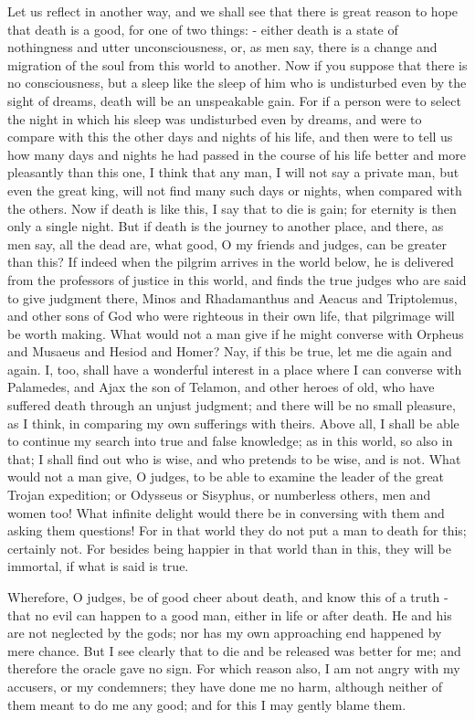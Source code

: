 \documentclass[11pt]{article}
\begin{document}
Let us reflect in another way, and we shall see that there is great reason to hope that death is a good, for one of two things: - either death is a state of nothingness and utter unconsciousness, or, as men say, there is a change and migration of the soul from this world to another. Now if you suppose that there is no consciousness, but a sleep like the sleep of him who is undisturbed even by the sight of dreams, death will be an unspeakable gain. For if a person were to select the night in which his sleep was undisturbed even by dreams, and were to compare with this the other days and nights of his life, and then were to tell us how many days and nights he had passed in the course of his life better and more pleasantly than this one, I think that any man, I will not say a private man, but even the great king, will not find many such days or nights, when compared with the others. Now if death is like this, I say that to die is gain; for eternity is then only a single night. But if death is the journey to another place, and there, as men say, all the dead are, what good, O my friends and judges, can be greater than this? If indeed when the pilgrim arrives in the world below, he is delivered from the professors of justice in this world, and finds the true judges who are said to give judgment there, Minos and Rhadamanthus and Aeacus and Triptolemus, and other sons of God who were righteous in their own life, that pilgrimage will be worth making. What would not a man give if he might converse with Orpheus and Musaeus and Hesiod and Homer? Nay, if this be true, let me die again and again. I, too, shall have a wonderful interest in a place where I can converse with Palamedes, and Ajax the son of Telamon, and other heroes of old, who have suffered death through an unjust judgment; and there will be no small pleasure, as I think, in comparing my own sufferings with theirs. Above all, I shall be able to continue my search into true and false knowledge; as in this world, so also in that; I shall find out who is wise, and who pretends to be wise, and is not. What would not a man give, O judges, to be able to examine the leader of the great Trojan expedition; or Odysseus or Sisyphus, or numberless others, men and women too! What infinite delight would there be in conversing with them and asking them questions! For in that world they do not put a man to death for this; certainly not. For besides being happier in that world than in this, they will be immortal, if what is said is true.

Wherefore, O judges, be of good cheer about death, and know this of a truth - that no evil can happen to a good man, either in life or after death. He and his are not neglected by the gods; nor has my own approaching end happened by mere chance. But I see clearly that to die and be released was better for me; and therefore the oracle gave no sign. For which reason also, I am not angry with my accusers, or my condemners; they have done me no harm, although neither of them meant to do me any good; and for this I may gently blame them.
\end{document}
